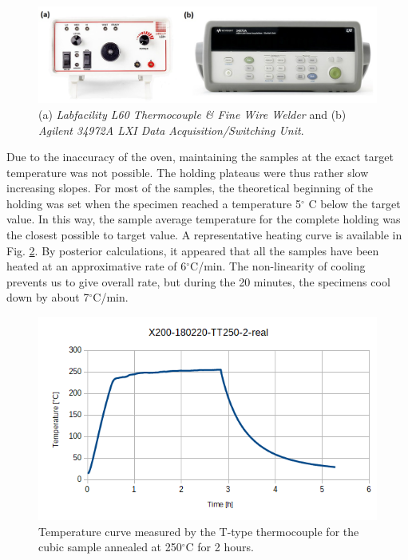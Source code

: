 \begin{figure}[ht]
	\centering
	\includegraphics[scale=0.30]{Images/agilent}
	\decoRule
	\caption[(a) \textit{Labfacility L60 Thermocouple \& Fine Wire Welder} and (b) \textit{Agilent 34972A LXI Data Acquisition/Switching Unit}.]{(a) \textit{Labfacility L60 Thermocouple \& Fine Wire Welder} and (b) \textit{Agilent 34972A LXI Data Acquisition/Switching Unit}.}
	\label{fig:agilent}
\end{figure}

Due to the inaccuracy of the oven, maintaining the samples at the exact target temperature was not possible. The holding plateaus were thus rather slow increasing slopes. For most of the samples, the theoretical beginning of the holding was set when the specimen reached a temperature 5$^\circ$ C below the target value. In this way, the sample average temperature for the complete holding was the closest possible to target value. A representative heating curve is available in Fig. \ref{fig:TT250-2-curve}. By posterior calculations, it appeared that all the samples have been heated at an approximative rate of 6$^\circ$C/min. The non-linearity of cooling prevents us to give overall rate, but during the 20 minutes, the specimens cool down by about 7$^\circ$C/min. \\

\begin{figure}[ht]
	\centering
	\includegraphics[scale=0.70]{Images/X200-180220-TT250-2-real}
	\decoRule
	\caption[Temperature curve measured by the T-type thermocouple for the cubic sample annealed at 250$^\circ$C for 2 hours.]{Temperature curve measured by the T-type thermocouple for the cubic sample annealed at 250$^\circ$C for 2 hours.}
	\label{fig:TT250-2-curve}
\end{figure}

